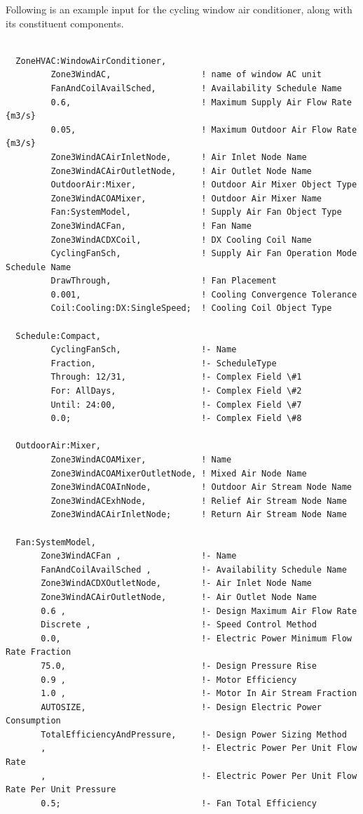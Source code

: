 Following is an example input for the cycling window air conditioner, along with its constituent components.

\begin{lstlisting}

  ZoneHVAC:WindowAirConditioner,
         Zone3WindAC,                  ! name of window AC unit
         FanAndCoilAvailSched,         ! Availability Schedule Name
         0.6,                          ! Maximum Supply Air Flow Rate {m3/s}
         0.05,                         ! Maximum Outdoor Air Flow Rate {m3/s}
         Zone3WindACAirInletNode,      ! Air Inlet Node Name
         Zone3WindACAirOutletNode,     ! Air Outlet Node Name
         OutdoorAir:Mixer,             ! Outdoor Air Mixer Object Type
         Zone3WindACOAMixer,           ! Outdoor Air Mixer Name
         Fan:SystemModel,              ! Supply Air Fan Object Type
         Zone3WindACFan,               ! Fan Name
         Zone3WindACDXCoil,            ! DX Cooling Coil Name
         CyclingFanSch,                ! Supply Air Fan Operation Mode Schedule Name
         DrawThrough,                  ! Fan Placement
         0.001,                        ! Cooling Convergence Tolerance
         Coil:Cooling:DX:SingleSpeed;  ! Cooling Coil Object Type

  Schedule:Compact,
         CyclingFanSch,                !- Name
         Fraction,                     !- ScheduleType
         Through: 12/31,               !- Complex Field \#1
         For: AllDays,                 !- Complex Field \#2
         Until: 24:00,                 !- Complex Field \#7
         0.0;                          !- Complex Field \#8

  OutdoorAir:Mixer,
         Zone3WindACOAMixer,           ! Name
         Zone3WindACOAMixerOutletNode, ! Mixed Air Node Name
         Zone3WindACOAInNode,          ! Outdoor Air Stream Node Name
         Zone3WindACExhNode,           ! Relief Air Stream Node Name
         Zone3WindACAirInletNode;      ! Return Air Stream Node Name

  Fan:SystemModel,
       Zone3WindACFan ,                !- Name
       FanAndCoilAvailSched ,          !- Availability Schedule Name
       Zone3WindACDXOutletNode,        !- Air Inlet Node Name
       Zone3WindACAirOutletNode,       !- Air Outlet Node Name
       0.6 ,                           !- Design Maximum Air Flow Rate
       Discrete ,                      !- Speed Control Method
       0.0,                            !- Electric Power Minimum Flow Rate Fraction
       75.0,                           !- Design Pressure Rise
       0.9 ,                           !- Motor Efficiency
       1.0 ,                           !- Motor In Air Stream Fraction
       AUTOSIZE,                       !- Design Electric Power Consumption
       TotalEfficiencyAndPressure,     !- Design Power Sizing Method
       ,                               !- Electric Power Per Unit Flow Rate
       ,                               !- Electric Power Per Unit Flow Rate Per Unit Pressure
       0.5;                            !- Fan Total Efficiency 


\end{lstlisting}
